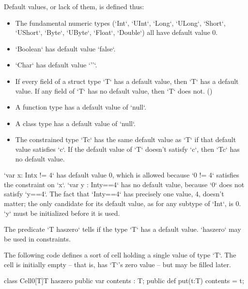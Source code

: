 Default values, or lack of them, is defined thus:
\begin{itemize}
\item The fundamental numeric types (\xcd`Int`, \xcd`UInt`,
      \xcd`Long`, \xcd`ULong`, 
  \xcd`Short`, \xcd`UShort`, \xcd`Byte`,
   \xcd`UByte`, 
      \xcd`Float`, \xcd`Double`) all have default value 0.
\item \xcd`Boolean` has default value \xcd`false`.
\item \xcd`Char` has default value \xcd`'\0'`.
\item If every field of a struct type \xcd`T` has a default value, then
      \xcd`T` has a default value.  If any field of \xcd`T` has no default
      value, then \xcd`T` does not.  ()
\item A function type has a default value of \xcd`null`.
\item A class type has a default value of \xcd`null`.
\item The constrained type \xcd`T{c}` has the same default value as \xcd`T` if
      that default value satisfies \xcd`c`.  If the default value of \xcd`T`
      doesn't satisfy \xcd`c`, then \xcd`T{c}` has no default value.
\end{itemize}

\begin{ex}
\xcd`var x: Int{x != 4}` has default value 0, which is allowed
because \xcd`0 != 4` satisfies the constraint on \xcd`x`. 
\xcd`var y : Int{y==4}` has no default value, because \xcd`0` does not satisfy \xcd`y==4`.
The fact that \xcd`Int{y==4}` has precisely one value, \viz{} 4, doesn't
matter; the only candidate for its default value, as for any subtype of
\xcd`Int`, is 0. \xcd`y` must be initialized before it is used.
\end{ex}

The predicate \xcd`T haszero` tells if the type \xcd`T` has a default value.
\xcd`haszero` may be used in constraints. 

\begin{ex}
The following code defines a sort of cell holding a single value of type
\xcd`T`. The cell is initially empty -- that is, has \xcd`T`'s zero value --
but may be filled later. 
\begin{xten}
class Cell0[T]{T haszero} {
  public var contents : T;
  public def put(t:T) { contents = t; }
}
\end{xten}
%
\end{ex}

